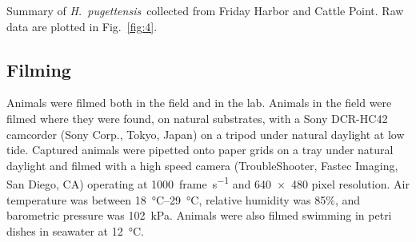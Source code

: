 \documentclass{article}
\newcommand{\Genus}[1]{\emph{#1}}
\newcommand{\Hyale}{\Genus{H.~pugettensis}}
\begin{document}
	




\begin{table}
\caption{Summary of \Hyale\ collected from Friday Harbor and Cattle Point.  Raw data are plotted in Fig.~\ref{fig:4}.}
\label{table:1}
\end{table}

\subsection*{Filming}
	Animals were filmed both in the field and in the lab.  Animals in the field were filmed where they were found, on natural substrates, with a Sony DCR-HC42 camcorder (Sony Corp., Tokyo, Japan) on a tripod under natural daylight at low tide.  Captured animals were pipetted onto paper grids on a tray under natural daylight and filmed with a high speed camera (TroubleShooter, Fastec Imaging, San Diego, CA) operating at \SI{1000}{frame\per\second} and \num{640x480} pixel resolution.  Air temperature was between \SIrange{18}{29}{\celsius}, relative humidity was 85\%, and barometric pressure was \SI{102}{\kilo\pascal}.  Animals were also filmed swimming in petri dishes in seawater at \SI{12}{\celsius}.  
\end{document}

